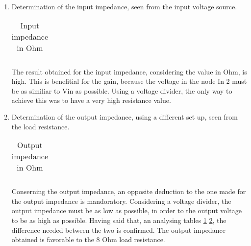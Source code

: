 \begin{enumerate}
\begin{figure}[ht]
\centering
\begin{subfigure}{.5\textwidth}
  \centering
  \texttt{[image: vo1f.pdf]}
  \caption{Input Voltage}
  \label{fig:sim4}
\end{subfigure}%
\begin{subfigure}{.5\textwidth}
  \centering
  \texttt{[image: vo2f.pdf]}
  \caption{Output voltage}
  \label{fig:sim5}
\end{subfigure}
\end{figure}




\item Determination of the input impedance, seen from the input voltage source.

\begin{table}[h]
  \centering
  \begin{tabular}{|l|r|}
    \hline    
   
   \end{tabular}
  \caption{Input impedance in Ohm}
    \label{tab:ZI}
\end{table}

\par The result obtained for the input impedance, considering the value in Ohm, is high. This is benefitial for the gain, because the voltage in the node In 2 must be as similiar to Vin as possible. Using a voltage divider, the only way to achieve this was to have a very high resistance value.

\item Determination of the output impedance, using a different set up, seen from the load resistance. 

\begin{table}[h]
  \centering
  \begin{tabular}{|l|r|}
    \hline    
   
   \end{tabular}
  \caption{Output impedance in Ohm}
  
  \label{tab:ZO}
\end{table}


Conserning the output impedance, an opposite deduction to the one made for the output impedance is mandoratory. Considering a voltage divider, the output impedance must be as low as possible, in order to the output voltage to be as high as possible. Having said that, an analysing tables \ref{tab:ZI} \ref{tab:ZO}, the difference needed between the two is confirmed. The output impedance obtained is favorable to the 8 Ohm load resistance.


\end{enumerate}
